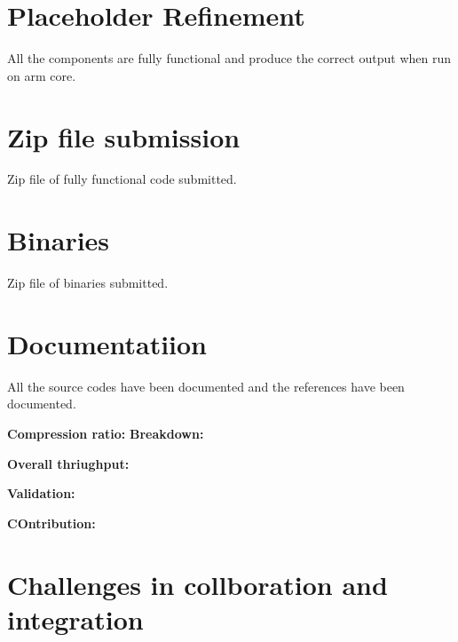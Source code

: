 \documentclass{article}
\begin{document}
\section{Placeholder Refinement}
All the components are fully functional and produce the correct output when run on arm core. 

\section{Zip file submission}
Zip file of fully functional code submitted.

\section{Binaries}
Zip file of binaries submitted.

\section{Documentatiion}
\item%
All the source codes have been documented and the references have been documented. 

\item%
\textbf{Compression ratio:}
\textbf{Breakdown:}

\item%
\textbf{Overall thriughput:}

\item%
\textbf{Validation:}

\item%
\textbf{COntribution:}


\section{Challenges in collboration and integration}


\begin{appendices}
%
%
%


\end{appendices}
\end{document}
